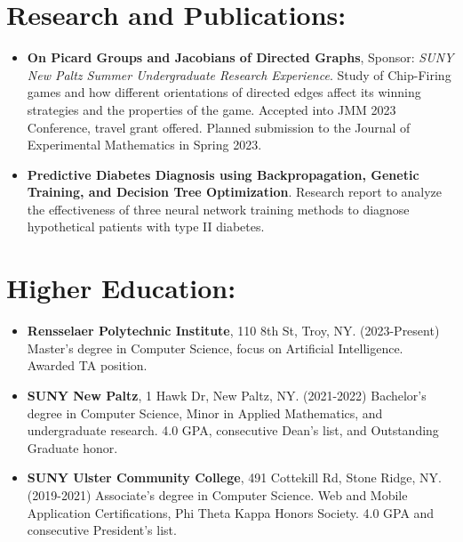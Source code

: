 \documentclass[11pt]{article}
\begin{document}
    \section*{Research and Publications:}
    \begin{itemize}
        \itemsep0em 
        \item \textbf{On Picard Groups and Jacobians of Directed Graphs}, 
            Sponsor: \textit{SUNY New Paltz Summer Undergraduate Research Experience}. 
            Study of Chip-Firing games and how different orientations of directed edges affect its 
            winning strategies and the properties of the game.  Accepted into JMM 2023 Conference, travel 
            grant offered.  Planned submission to the Journal of Experimental Mathematics in Spring 2023.
        \item \textbf{Predictive Diabetes Diagnosis using Backpropagation, Genetic Training, and Decision 
            Tree Optimization}. Research report to analyze the effectiveness of three neural network 
            training methods to diagnose hypothetical patients with type II diabetes.
    \end{itemize}

    \section*{Higher Education:}
    \begin{itemize}
        \itemsep0em
        \item \textbf{Rensselaer Polytechnic Institute}, 110 8th St, Troy, NY. (2023-Present) 
        Master's degree in Computer Science, focus on Artificial Intelligence.  Awarded TA position.
        \item \textbf{SUNY New Paltz}, 1 Hawk Dr, New Paltz, NY. (2021-2022) Bachelor's degree in 
            Computer Science, Minor in Applied Mathematics, and undergraduate research. 4.0 GPA, 
            consecutive Dean's list, and Outstanding Graduate honor.
        \item \textbf{SUNY Ulster Community College}, 491 Cottekill Rd, Stone Ridge, NY. (2019-2021) 
            Associate's degree in Computer Science. Web and Mobile Application Certifications, 
            Phi Theta Kappa Honors Society. 4.0 GPA and consecutive President's list.
    \end{itemize}
\end{document}
